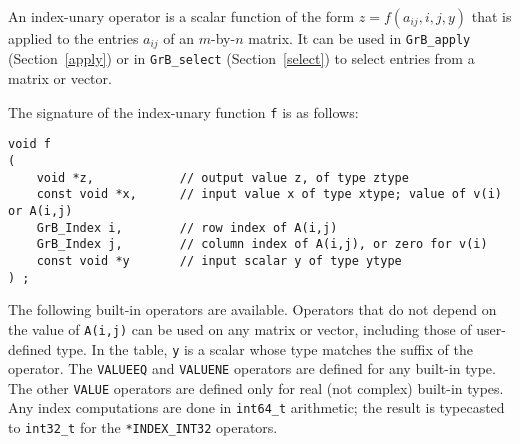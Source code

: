 \documentclass[12pt]{article}
\begin{document}
An index-unary operator is a scalar function of the form
$z=f(a_{ij},i,j,y)$ that is applied to the entries $a_{ij}$ of an
$m$-by-$n$ matrix.  It can be used in \verb'GrB_apply' (Section~\ref{apply}) or
in \verb'GrB_select' (Section~\ref{select}) to select entries from a matrix or
vector.

The signature of the index-unary function \verb'f' is as follows:

{\footnotesize
\begin{verbatim}
void f
(
    void *z,            // output value z, of type ztype
    const void *x,      // input value x of type xtype; value of v(i) or A(i,j)
    GrB_Index i,        // row index of A(i,j)
    GrB_Index j,        // column index of A(i,j), or zero for v(i)
    const void *y       // input scalar y of type ytype
) ; \end{verbatim}}

The following built-in operators are available.  Operators that do not depend
on the value of \verb'A(i,j)' can be used on any matrix or vector, including
those of user-defined type.  In the table, \verb'y' is a
scalar whose type matches the suffix of the operator.  The \verb'VALUEEQ' and
\verb'VALUENE' operators are defined for any built-in type. The other
\verb'VALUE' operators are defined only for real (not complex) built-in types.
Any index computations are done in \verb'int64_t' arithmetic; the result is
typecasted to \verb'int32_t' for the \verb'*INDEX_INT32' operators.
\end{document}
